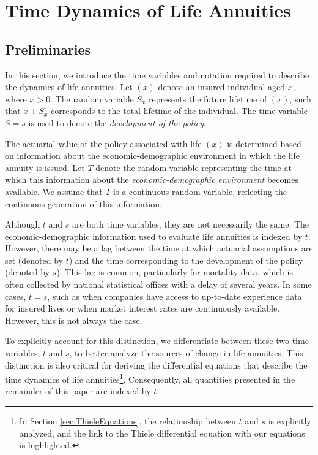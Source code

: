 \documentclass[12pt]{article}
\begin{document}
\section{Time Dynamics of Life Annuities}\label{sec:TimeDynamics}
\subsection{Preliminaries}\label{preliminaries}

In this section, we introduce the time variables and notation required to describe the dynamics of life annuities. Let $(x)$ denote an insured individual aged $x$, where $x > 0$. The random variable \( S_x \) represents the future lifetime of $(x)$, such that \( x + S_x \) corresponds to the total lifetime of the individual. The time variable \( S = s \) is used to denote the \textit{development of the policy}.

The actuarial value of the policy associated with life $(x)$ is determined based on information about the economic-demographic environment in which the life annuity is issued. Let \( T \) denote the random variable representing the time at which this information about the \textit{economic-demographic environment} becomes available. We assume that \( T \) is a continuous random variable, reflecting the continuous generation of this information.

Although \( t \) and \( s \) are both time variables, they are not necessarily the same. The economic-demographic information used to evaluate life annuities is indexed by \( t \). However, there may be a lag between the time at which actuarial assumptions are set (denoted by \( t \)) and the time corresponding to the development of the policy (denoted by \( s \)). This lag is common, particularly for mortality data, which is often collected by national statistical offices with a delay of several years. In some cases, \( t = s \), such as when companies have access to up-to-date experience data for insured lives or when market interest rates are continuously available. However, this is not always the case.

To explicitly account for this distinction, we differentiate between these two time variables, \( t \) and \( s \), to better analyze the sources of change in life annuities. This distinction is also critical for deriving the differential equations that describe the time dynamics of life annuities\footnote{In Section \ref{sec:ThieleEquations}, the relationship between \( t \) and \( s \) is explicitly analyzed, and the link to the Thiele differential equation with our equations is highlighted.}. Consequently, all quantities presented in the remainder of this paper are indexed by \( t \).
\end{document}

